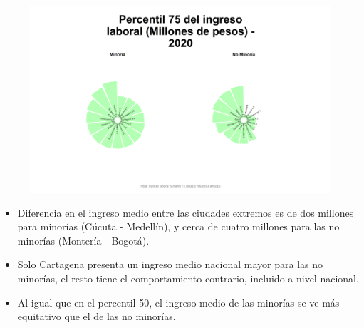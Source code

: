     \begin{figure}[H]
        \caption[Percentil 75 del ingreso laboral por ciudades principales para minorías - 2020]{\label{ingreso_laboral_75_ciudades_minorias} }
        \begin{center}
        \includegraphics[width=\textwidth,keepaspectratio]{img/var_24_static.png}
        \end{center}
    \end{figure}
            \begin{itemize}
                    \item Diferencia en el ingreso medio entre las ciudades extremos es de dos millones para minorías (Cúcuta - Medellín), y cerca de cuatro millones para las no minorías (Montería - Bogotá).
                    \item Solo Cartagena presenta un ingreso medio nacional mayor para las no minorías, el resto tiene el comportamiento contrario, incluido a nivel nacional.
                    \item Al igual que en el percentil 50, el ingreso medio de las minorías se ve más equitativo que el de las no minorías.
                \end{itemize}

